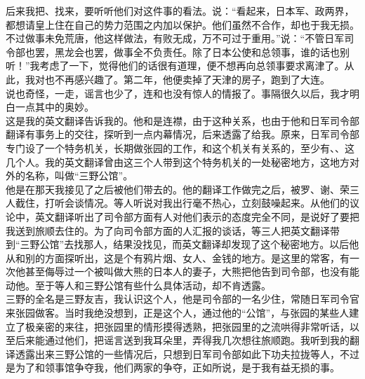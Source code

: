 后来我把、找来，要听听他们对这件事的看法。说：“看起来，日本军、政两界，都想请皇上住在自己的势力范围之内加以保护。他们虽然不合作，却也于我无损。不过做事未免荒唐，他这样做法，有败无成，万不可过于重用。”说：“不管日军司令部也罢，黑龙会也罢，做事全不负责任。除了日本公使和总领事，谁的话也别听！”我考虑了一下，觉得他们的话很有道理，便不想再向总领事要求离津了。从此，我对也不再感兴趣了。第二年，他便卖掉了天津的房子，跑到了大连。\\

说也奇怪，一走，谣言也少了，连和也没有惊人的情报了。事隔很久以后，我才明白一点其中的奥妙。\\

这是我的英文翻译告诉我的。他和是连襟，由于这种关系，也由于他和日军司令部翻译有事务上的交往，探听到一点内幕情况，后来透露了给我。原来，日军司令部专门设了一个特务机关，长期做张园的工作，和这个机关有关系的，至少有、、这几个人。我的英文翻译曾由这三个人带到这个特务机关的一处秘密地方，这地方对外的名称，叫做“三野公馆”。\\

他是在那天我接见了之后被他们带去的。他的翻译工作做完之后，被罗、谢、荣三人截住，打听会谈情况。等人听说对我出行毫不热心，立刻鼓噪起来。从他们的议论中，英文翻译听出了司令部方面有人对他们表示的态度完全不同，是说好了要把我送到旅顺去住的。为了向司令部方面的人汇报的谈话，等三人把英文翻译带到“三野公馆”去找那人，结果没找见，而英文翻译却发现了这个秘密地方。以后他从和别的方面探听出，这是个有鸦片烟、女人、金钱的地方。是这里的常客，有一次他甚至侮辱过一个被叫做大熊的日本人的妻子，大熊把他告到司令部，也没有能动他。至于等人和三野公馆有些什么具体活动，却不肯透露。\\

三野的全名是三野友吉，我认识这个人，他是司令部的一名少住，常随日军司令官来张园做客。当时我绝没想到，正是这个人，通过他的“公馆”，与张园的某些人建立了极亲密的来往，把张园里的情形摸得透熟，把张园里的之流哄得非常听话，以至后来能通过他们，把谣言送到我耳朵里，弄得我几次想往旅顺跑。我听到我的翻译透露出来三野公馆的一些情况后，只想到日军司令部如此下功夫拉拢等人，不过是为了和领事馆争夺我，他们两家的争夺，正如所说，是于我有益无损的事。\\

